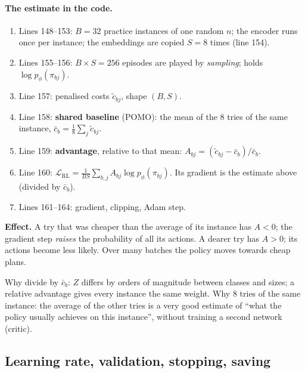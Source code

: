 \paragraph{The estimate in the code.}
\begin{enumerate}
  \item Lines 148--153: $B=32$ practice instances of one random $n$; the encoder runs once per instance; the embeddings are copied $S=8$ times (line 154).
  \item Lines 155--156: $B\times S=256$ episodes are played by \emph{sampling};  holds $\log p_\phi(\pi_{bj})$.
  \item Line 157: penalised costs $\tilde c_{bj}$, shape $(B,S)$.
  \item Line 158: \textbf{shared baseline} (POMO): the mean of the 8 tries of the same instance, $\bar c_b=\frac18\sum_j\tilde c_{bj}$.
  \item Line 159: \textbf{advantage}, relative to that mean: $A_{bj}=(\tilde c_{bj}-\bar c_b)/\bar c_b$.
  \item Line 160: $\mathcal L_{\text{RL}}=\frac{1}{BS}\sum_{b,j}A_{bj}\log p_\phi(\pi_{bj})$. Its gradient is the estimate above (divided by $\bar c_b$).
  \item Lines 161--164: gradient, clipping, Adam step.
\end{enumerate}
\textbf{Effect.} A try that was cheaper than the average of its instance has $A<0$; the gradient step \emph{raises} the probability of all its actions. A dearer try has $A>0$; its actions become less likely. Over many batches the policy moves towards cheap plans.

Why divide by $\bar c_b$: $Z$ differs by orders of magnitude between classes and sizes; a relative advantage gives every instance the same weight. Why 8 tries of the same instance: the average of the other tries is a very good estimate of ``what the policy usually achieves on this instance'', without training a second network (critic).

\subsection{Learning rate, validation, stopping, saving}


